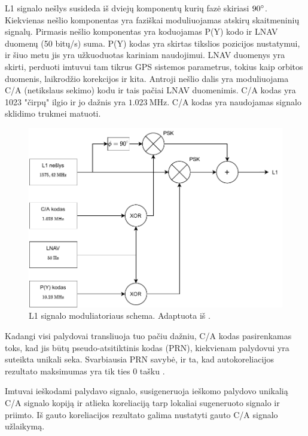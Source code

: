 \documentclass[main.tex]{subfiles}
\begin{document}
L1 signalo nešlys susideda iš dviejų komponentų kurių fazė skiriasi $90\degree$.
Kiekvienas nešlio komponentas yra faziškai moduliuojamas atskirų skaitmeninių signalų.
Pirmasis nešlio komponentas yra koduojamas P(Y) kodo ir LNAV duomenų (50 bitų/s) suma.
P(Y) kodas yra skirtas tikslios pozicijos nustatymui, ir šiuo metu jis yra užkuoduotas
kariniam naudojimui.
LNAV duomenys yra skirti, perduoti imtuvui tam tikrus GPS sistemos parametrus, tokius
kaip orbitos duomenis, laikrodžio korekcijos ir kita.
Antroji nešlio dalis yra moduliuojama C/A (netikslaus sekimo) kodu ir tais pačiai LNAV
duomenimis. C/A kodas yra 1023 "čirpų" ilgio ir jo dažnis yra $1.023\ \mathrm{MHz}$.
C/A kodas yra naudojamas signalo sklidimo trukmei matuoti.

\begin{figure}[h]
    \begin{centering}
    \includegraphics[scale=0.85]{drawings/l1_signal}
    \par\end{centering}
    \protect\caption{\label{fig:l1_signal}L1 signalo moduliatoriaus schema. Adaptuota iš \cite{Sadeghi2008TimeSS}.}
\end{figure}

Kadangi visi palydovai transliuoja tuo pačiu dažniu, C/A kodas pasirenkamas toks,
kad jis būtų pseudo-atsitiktinis kodas (PRN), kiekvienam palydovui yra suteikta unikali seka.
Svarbiausia PRN savybė, ir ta, kad autokoreliacijos rezultato maksimumas yra tik
ties 0 tašku \cite{OCHIN202121_chapter2}.

Imtuvai ieškodami palydavo signalo, susigeneruoja ieškomo palydovo unikalią C/A signalo
kopiją ir atlieka koreliaciją tarp lokaliai sugeneruoto signalo ir priimto.
Iš gauto koreliacijos rezultato galima nustatyti gauto C/A signalo užlaikymą.
\end{document}
